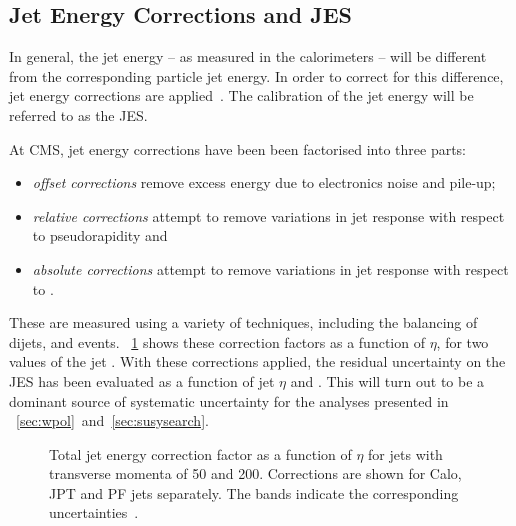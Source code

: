 \subsection{Jet Energy Corrections and \acl{JES}}
In general, the jet energy -- as measured in the calorimeters -- will be
different from the corresponding particle jet energy. In order to correct for
this difference, jet energy corrections are
applied~\cite{jet_energy_cms,jet_energy_pas}. The calibration of the jet energy
will be referred to as the \acf{JES}.

At \ac{CMS}, jet energy corrections have been been factorised into three parts:
\begin{itemize}
\item \emph{offset corrections} remove excess energy due to electronics noise
  and pile-up;
\item \emph{relative corrections} attempt to remove variations in jet response
  with respect to pseudorapidity and
\item \emph{absolute corrections} attempt to remove variations in jet response
  with respect to \Pt.
\end{itemize}

These are measured using a variety of techniques, including the balancing of
dijets, \gammajets and \Zjets events. \fig~\ref{fig:reco_jet_energy_corr} shows
these correction factors as a function of $\eta$, for two values of the jet
\Pt. With these corrections applied, the residual uncertainty on the \ac{JES}
has been evaluated as a function of jet $\eta$ and \Pt. This will turn out to be
a dominant source of systematic uncertainty for the analyses presented in
\chaps~\ref{sec:wpol}~and~\ref{sec:susysearch}.

\begin{figure}
  \centering
  \quad
  \quad
  \caption[Total jet energy correction factor as a function of $\eta$ for jets
  with transverse momenta of \unit{50}{\GeV} and \unit{200}{\GeV}]{Total jet
    energy correction factor as a function of $\eta$ for jets with transverse
    momenta of \unit{50}{\GeV} and \unit{200}{\GeV}. Corrections are shown for
    \ac{Calo}, \ac{JPT} and \ac{PF} jets separately. The bands indicate the
    corresponding uncertainties~\cite{jet_energy_pas}.}
  \label{fig:reco_jet_energy_corr}
\end{figure}

